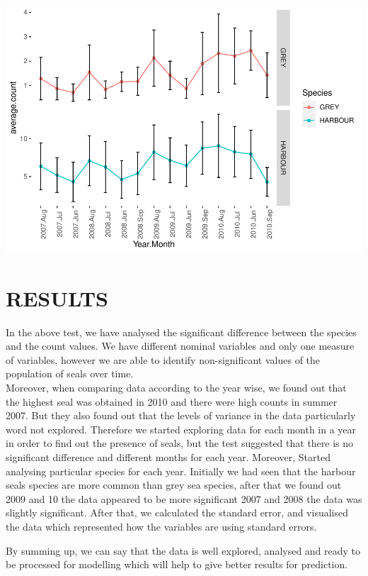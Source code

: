 \documentclass[
]{article}
\begin{document}
\includegraphics{Statistical-analysis-in-RStudio_files/figure-latex/unnamed-chunk-39-1.pdf}

\hypertarget{results}{%
\section{RESULTS}\label{results}}

In the above test, we have analysed the significant difference between
the species and the count values. We have different nominal variables
and only one measure of variables, however we are able to identify
non-significant values of the population of seals over time.\\
Moreover, when comparing data according to the year wise, we found out
that the highest seal was obtained in 2010 and there were high counts in
summer 2007. But they also found out that the levels of variance in the
data particularly word not explored. Therefore we started exploring data
for each month in a year in order to find out the presence of seals, but
the test suggested that there is no significant difference and different
months for each year. Moreover, Started analysing particular species for
each year. Initially we had seen that the harbour seals species are more
common than grey sea species, after that we found out 2009 and 10 the
data appeared to be more significant 2007 and 2008 the data was slightly
significant. After that, we calculated the standard error, and
visualised the data which represented how the variables are using
standard errors.

By summing up, we can say that the data is well explored, analysed and
ready to be processed for modelling which will help to give better
results for prediction.
\end{document}
